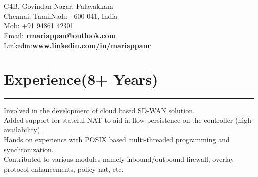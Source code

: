 \documentclass[]{mariappan-resume}
\begin{document}
\hfill
\begin{minipage}[t]{0.66\textwidth} 
\hspace*{0pt}\hfill    \\
\hspace*{0pt}\hfill    \\
\hspace*{0pt}\hfill G4B, Govindan Nagar, Palavakkam \\
\hspace*{0pt}\hfill Chennai, TamilNadu - 600 041, India \\
\hspace*{0pt}\hfill Mob: +91 94861 42301 \\
\hspace*{0pt}\hfill Email:\textbf{\href{mailto:rmariappan@outlook.com}{ rmariappan@outlook.com}} \\
\hspace*{0pt}\hfill Linkedin:\textbf{\href{https://www.linkedin.com/in/mariappanr}{www.linkedin.com/in/mariappanr}}
\section{Experience(8+ Years)}
\noindent\rule[3mm]{12.5cm}{0.4pt}
 
\noindent
\hspace{5em}%
\begin{minipage}{0.85\textwidth\vspace{2pt}}
Involved in the development of cloud based SD-WAN solution.\\
Added support for stateful NAT to aid in flow persistence on the controller (high-availability).\\
Hands on experience with POSIX based multi-threaded programming and synchronization.\\
Contributed to various modules namely inbound/outbound firewall, overlay protocol enhancements, policy nat, etc.
\end{minipage}
\sectionsep


\end{minipage}
\end{document}
